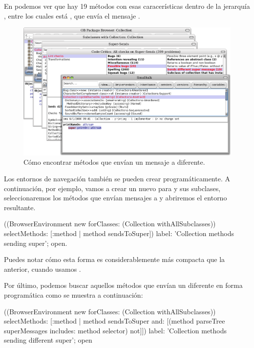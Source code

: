 \documentclass[a4paper,10pt,twoside]{book}
\begin{document}
En  podemos ver que hay 19 m\'etodos con esas
caracer\'isticas dentro de la jerarqu\'ia , entre los
cuales est\'a , que env\'ia el mensaje
.
\begin{figure}[ht]\centering
        \includegraphics[width=\linewidth]{sendDifferentSuper}
        \caption{C\'omo encontrar m\'etodos que env\'ian un mensaje a \super diferente.}
\end{figure}

Los entornos de navegaci\'on tambi\'en se pueden crear program\'aticamente.
A continuaci\'on, por ejemplo, vamos a crear un nuevo
 para  y sus subclases,
seleccionaremos los m\'etodos que env\'ian mensajes a \super y abriremos
el entorno resultante.
\begin{code}{}
((BrowserEnvironment new forClasses: (Collection withAllSubclasses))
        selectMethods: [:method | method sendsToSuper])
        label: 'Collection methods sending super';
        open.
\end{code}{}

Puedes notar c\'omo esta forma es considerablemente m\'as compacta que la
anterior, cuando usamos .

Por \'ultimo, podemos buscar aquellos m\'etodos que env\'ian un \super
diferente en forma program\'atica como se muestra a continuaci\'on:
\begin{code}{}
((BrowserEnvironment new forClasses: (Collection withAllSubclasses))
        selectMethods: [:method |
                method sendsToSuper
                and: [(method parseTree superMessages includes: method selector) not]])
        label: 'Collection methods sending different super';
        open
\end{code}
\end{document}
